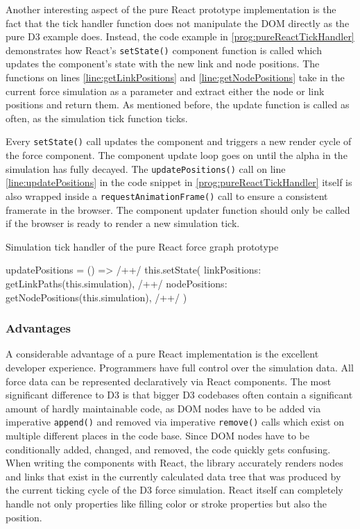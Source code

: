 Another interesting aspect of the pure React prototype implementation is the fact that the tick handler function does not manipulate the DOM directly as the pure D3 example does. Instead, the code example in \ref{prog:pureReactTickHandler} demonstrates how React's \texttt{setState()} component function is called which updates the component's state with the new link and node positions. The functions on lines \ref{line:getLinkPositions} and \ref{line:getNodePositions} take in the current force simulation as a parameter and extract either the node or link positions and return them. As mentioned before, the update function is called as often, as the simulation tick function ticks. 

Every \texttt{setState()} call updates the component and triggers a new render cycle of the force component. The component update loop goes on until the alpha in the simulation has fully decayed. The \texttt{updatePositions()} call on line \ref{line:updatePositions} in the code snippet in \ref{prog:pureReactTickHandler} itself is also wrapped inside a \texttt{requestAnimationFrame()} call to ensure a consistent framerate in the browser. The component updater function should only be called if the browser is ready to render a new simulation tick.

\begin{program}
\caption{Simulation tick handler of the pure React force graph prototype}
\label{prog:pureReactTickHandler}
\begin{JsCode}
updatePositions = () => { /+\label{line:updatePositions}+/
  this.setState({
    linkPositions: getLinkPaths(this.simulation), /+\label{line:getLinkPositions}+/
    nodePositions: getNodePositions(this.simulation), /+\label{line:getNodePositions}+/
  })
}
\end{JsCode}
\end{program}

\subsubsection{Advantages}


A considerable advantage of a pure React implementation is the excellent developer experience. Programmers have full control over the simulation data. All force data can be represented declaratively via React components. The most significant difference to D3 is that bigger D3 codebases often contain a significant amount of hardly maintainable code, as DOM nodes have to be added via imperative \texttt{append()} and removed via imperative \texttt{remove()} calls which exist on multiple different places in the code base. Since DOM nodes have to be conditionally added, changed, and removed, the code quickly gets confusing. When writing the components with React, the library accurately renders nodes and links that exist in the currently calculated data tree that was produced by the current ticking cycle of the D3 force simulation. React itself can completely handle not only properties like filling color or stroke properties but also the position.

